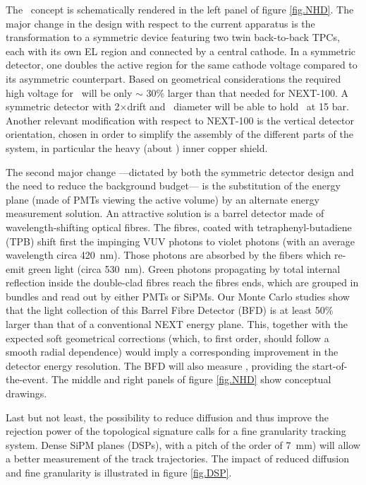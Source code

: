  \indent
 
The \NHD\ concept is schematically rendered in the left panel of figure \ref{fig.NHD}. %
The major change in the design with respect to the current apparatus is the transformation to a symmetric device featuring two twin back-to-back TPCs, each  with its own EL region and connected by a central cathode. In a symmetric detector, one doubles the active region for the same cathode voltage compared to its asymmetric counterpart.  Based on geometrical considerations the required high voltage for \NHD\ will be only $\sim$ 30\% larger than that needed for NEXT-100. A symmetric detector with 2$\times$\XHDL drift and \XHDD\ diameter will be able to hold \XHDM\ at 15 bar. Another relevant modification with respect to NEXT-100 is the vertical detector orientation, chosen in order to simplify the assembly of the different parts of the system, in particular the heavy (about \XHDS) inner copper shield. 

\indent

The second major change ---dictated by both the symmetric detector design and the need to reduce the background budget--- is the substitution of the energy plane (made of PMTs viewing the active volume) by an alternate energy measurement solution.  An attractive solution is a barrel detector made of wavelength-shifting optical fibres. The fibres, coated with tetraphenyl-butadiene (TPB) shift first the impinging VUV photons to violet photons (with an average wavelength circa \SI{420}{\nm}). Those photons are absorbed by the fibers which re-emit green light (circa  \SI{530}{\nm}). Green photons propagating by total internal reflection inside the double-clad fibres reach the fibres ends, which are grouped in bundles and read out by either PMTs or SiPMs. Our Monte Carlo studies show that the light collection of this Barrel Fibre Detector (BFD) is at least 50\% larger than that of a conventional NEXT energy plane. This, together with the expected soft geometrical corrections (which, to first order, should follow a smooth radial dependence) would imply a corresponding improvement in the detector energy resolution. The BFD will also measure \sone, providing the start-of-the-event.  The middle and right panels of figure \ref{fig.NHD} show conceptual drawings. 

\indent

Last but not least, the possibility to reduce diffusion and thus improve the rejection power of the topological signature calls for a fine granularity tracking system. Dense SiPM planes (DSPs), with a pitch of the order of \SI{7}{\mm}) will allow a better measurement of the track trajectories. The impact of reduced diffusion and fine granularity is illustrated in figure  \ref{fig.DSP}. 

